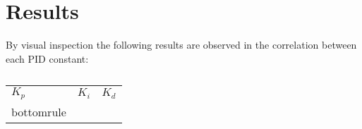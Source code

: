 \documentclass[main.tex]{subfile}
\begin{document}
\section{Results} 
\label{sec:results}

By visual inspection the following results are observed in the correlation
between each PID constant:

\begin{table}[H]
	\begin{tabularx}{width=\textwidth}{lll}
		\toprule
		$K_p$ & $K_i$ & $K_d$
		\\bottomrule
	\end{tabularx}
	\caption{}
	\label{tab:}
\end{table}



\end{document}
